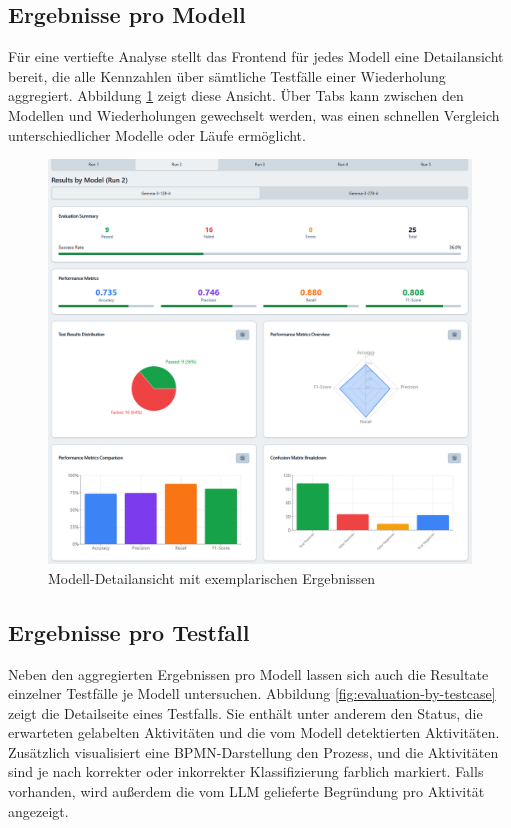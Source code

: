 \subsection*{Ergebnisse pro Modell}

Für eine vertiefte Analyse stellt das Frontend für jedes Modell eine Detailansicht bereit, die alle Kennzahlen über sämtliche Testfälle einer Wiederholung aggregiert. Abbildung \ref{fig:evaluation-by-model} zeigt diese Ansicht. Über Tabs kann zwischen den Modellen und Wiederholungen gewechselt werden, was einen schnellen Vergleich unterschiedlicher Modelle oder Läufe ermöglicht.

\begin{figure}[h]
    \centering
    \includegraphics[width=\textwidth]{images/evaluation/evaluation-result-by-model_new}
    \caption{Modell-Detailansicht mit exemplarischen Ergebnissen}
    \label{fig:evaluation-by-model}
\end{figure}

\subsection*{Ergebnisse pro Testfall}

Neben den aggregierten Ergebnissen pro Modell lassen sich auch die Resultate einzelner Testfälle je Modell untersuchen. Abbildung \ref{fig:evaluation-by-testcase} zeigt die Detailseite eines Testfalls. Sie enthält unter anderem den Status, die erwarteten gelabelten Aktivitäten und die vom Modell detektierten Aktivitäten. Zusätzlich visualisiert eine \ac{BPMN}-Darstellung den Prozess, und die Aktivitäten sind je nach korrekter oder inkorrekter Klassifizierung farblich markiert. Falls vorhanden, wird außerdem die vom  \ac{LLM} gelieferte Begründung pro Aktivität angezeigt.

